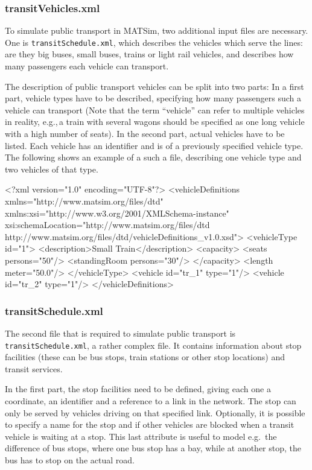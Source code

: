 \subsubsection{transitVehicles.xml}
To simulate public transport in MATSim, two additional input files are necessary. One is \lstinline|transitSchedule.xml|, which describes the vehicles which serve the lines: are they big buses, small buses, trains or light rail vehicles, and describes how many passengers each vehicle can transport.

The description of public transport vehicles can be split into two parts: In a first part, vehicle types have to be described, specifying how many passengers such a vehicle can transport (Note that the term ``vehicle'' can refer to multiple vehicles in reality, e.g.,\,a train with several wagons should be specified as one long vehicle with a high number of seats). In the second part, actual vehicles have to be listed. Each vehicle has an identifier and is of a previously specified vehicle type. The following shows an example of a such a file, describing one vehicle type and two vehicles of that type. 

\begin{xml}
<?xml version="1.0" encoding="UTF-8"?> 
<vehicleDefinitions xmlns="http://www.matsim.org/files/dtd" 
       xmlns:xsi="http://www.w3.org/2001/XMLSchema-instance" 
       xsi:schemaLocation="http://www.matsim.org/files/dtd 
                     http://www.matsim.org/files/dtd/vehicleDefinitions_v1.0.xsd"> 
	<vehicleType id="1"> 
      <description>Small Train</description> 
      <capacity> 
         <seats persons="50"/> 
         <standingRoom persons="30"/> 
      </capacity> 
      <length meter="50.0"/> 
   </vehicleType> 
   <vehicle id="tr_1" type="1"/> 
   <vehicle id="tr_2" type="1"/> 
</vehicleDefinitions>
\end{xml}

\subsubsection{transitSchedule.xml}
The second file that is required to simulate public transport is \lstinline|transitSchedule.xml|, a rather complex file. It contains information about stop facilities (these can be bus stops, train stations or other stop locations) and transit services.

In the first part, the stop facilities need to be defined, giving each one a coordinate, an identifier and a reference to a link in the network. The stop can only be served by vehicles driving on that specified link. Optionally, it is possible to specify a name for the stop and if other vehicles are blocked when a transit vehicle is waiting at a stop. This last attribute is useful to model e.g.\ the difference of bus stops, where one bus stop has a bay, while at another stop, the bus has to stop on the actual road.

